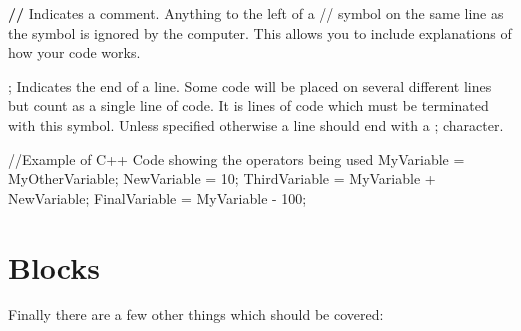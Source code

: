 \begin{DoxyItemize}
\item {\bfseries //} Indicates a comment. Anything to the left of a // symbol on the same line as the symbol is ignored by the computer. This allows you to include explanations of how your code works.
\item {\bfseries }; Indicates the end of a line. Some code will be placed on several different lines but count as a single line of code. It is lines of code which must be terminated with this symbol. Unless specified otherwise a line should end with a ; character. 
\begin{DoxyCode}
 //Example of C++ Code showing the operators being used
 MyVariable = MyOtherVariable;
 NewVariable = 10;
 ThirdVariable = MyVariable + NewVariable;
 FinalVariable = MyVariable - 100;
\end{DoxyCode}
 \par

\end{DoxyItemize}\hypertarget{_programming_basics_BasicsPageMisc}{}\section{Blocks}\label{_programming_basics_BasicsPageMisc}
Finally there are a few other things which should be covered:
